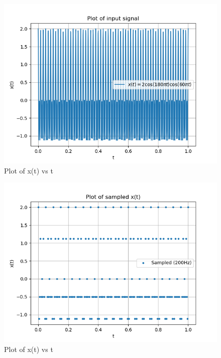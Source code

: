 \documentclass[journal,12pt,twocolumn]{IEEEtran}
\begin{document}
\begin{figure}[ht]
	\centering
	\includegraphics[width=1\linewidth]{figs/signalplot.png}
	\caption{Plot of x(t) vs t}
\end{figure}
\begin{figure}[ht]
	\includegraphics[width=1\linewidth]{figs/samplingplot.png}
	\caption{Plot of x(t) vs t}
\end{figure}
\end{document}

